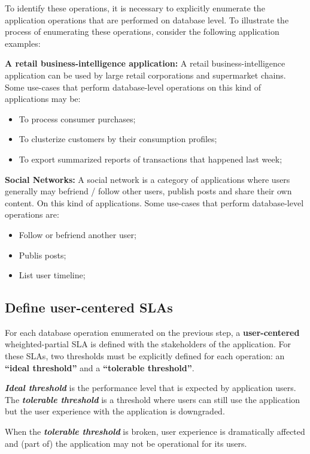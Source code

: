 To identify these operations, it is necessary to explicitly enumerate the application operations that are performed on database level. To illustrate the process of enumerating these operations, consider the following application examples: 

\textbf{A retail business-intelligence application: } A retail business-intelligence application can be used by large retail corporations and supermarket chains. Some use-cases that perform database-level operations on this kind of applications may be:

\begin{itemize}
\item{To process consumer purchases;}
\item{To clusterize customers by their consumption profiles;}
\item{To export summarized reports of transactions that happened last week;}
\end{itemize}

\textbf{Social Networks:} A social network is a category of applications where users generally may befriend / follow other users, publish posts and share their own content. On this kind of applications. Some use-cases that perform database-level operations are: 

\begin{itemize}
\item{Follow or befriend another user;}
\item{Publis posts;}
\item{List user timeline;}
\end{itemize}


\subsection{Define user-centered SLAs}

For each database operation enumerated on the previous step, a \textbf{user-centered} wheighted-partial SLA is defined with the stakeholders of the application. For these SLAs, two thresholds must be explicitly defined for each operation: an \textbf{``ideal threshold''} and a \textbf{``tolerable threshold''}.

\textbf{\textit{Ideal threshold}} is the performance level that is expected by application users. The \textbf{\textit{tolerable threshold}} is a threshold where users can still use the application but the user experience with the application is downgraded.

When the \textbf{\textit{tolerable threshold}} is broken, user experience is dramatically affected and (part of) the application may not be operational for its users.


